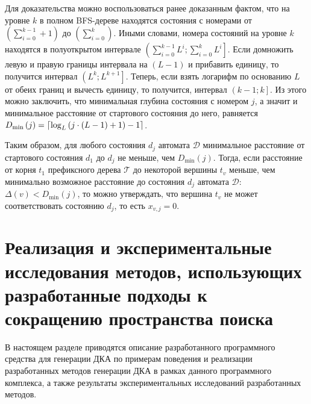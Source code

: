 Для доказательства можно воспользоваться ранее доказанным фактом, что на уровне $k$ в полном BFS-дереве находятся состояния с номерами от $\left(\sum_{i = 0}^{k - 1} + 1\right)$ до $\left(\sum_{i = 0}^{k}\right)$.
Иными словами, номера состояний на уровне $k$ находятся в полуоткрытом интервале $\left(\sum_{i = 0}^{k - 1}L^{i};\sum_{i = 0}^{k}L^{i}\right]$.
Если домножить левую и правую границы интервала на $(L - 1)$ и прибавить единицу, то получится интервал $\left(L^{k};L^{k + 1}\right]$.
Теперь, если взять логарифм по основанию $L$ от обеих границ и вычесть единицу, то получится, интервал $\left(k - 1; k\right]$.
Из этого можно заключить, что минимальная глубина состояния с номером $j$, а значит и минимальное расстояние от стартового состояния до него, равняется $D_{\min}\left(j\right) = \ceil*{\log_{L}\left(j \cdot \left(L - 1\right) + 1\right) - 1}$.

Таким образом, для любого состояния $d_{j}$ автомата $\mathcal{D}$ минимальное расстояние от стартового состояния $d_{1}$ до $d_{j}$ не меньше, чем $D_{\min}\left(j\right)$. 
Тогда, если расстояние от корня $t_{1}$ префиксного дерева $\mathcal{T}$ до некоторой вершины $t_{v}$ меньше, чем минимально возможное расстояние до состояния $d_{j}$ автомата $\mathcal{D}$: $\Delta\left(v\right) < D_{\min}\left(j\right)$, то можно утверждать, что вершина $t_{v}$ не может соответствовать состоянию $d_{j}$, то есть $x_{v,j} = 0$.





\section{Реализация и экспериментальные исследования методов, использующих разработанные подходы к сокращению пространства поиска}
\label{sec:space:results}

В настоящем разделе приводятся описание разработанного программного средства для генерации ДКА по примерам поведения и реализации разработанных методов генерации ДКА в рамках данного программного комплекса, а также результаты экспериментальных исследований разработанных методов.

